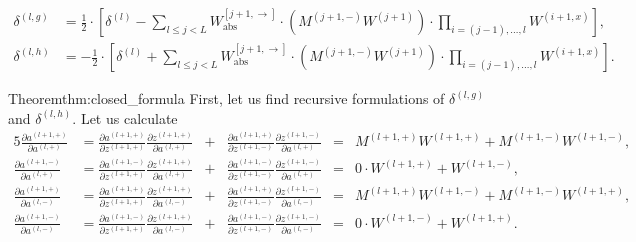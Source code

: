 \begin{theorem} \label{thm:closed_formula}
    \begin{align}
        \delta^{(l, g)}
            &= \frac{1}{2} \cdot \left[ \delta^{(l)}- \sum_{l \leq j < L} W_{\text{abs}}^{[j+1, \rightarrow]} \cdot \left( M^{(j+1,-)}W^{(j+1)} \right) \cdot \prod_{i = (j-1),\dots, l} W^{(i+1, x)} \right], \\
        \delta^{(l, h)}
            &= -\frac{1}{2} \cdot \left[ \delta^{(l)} + \sum_{l \leq j < L} W_{\text{abs}}^{[j+1, \rightarrow]} \cdot \left( M^{(j+1,-)}W^{(j+1)} \right) \cdot \prod_{i = (j-1),\dots, l} W^{(i+1, x)} \right].
    \end{align}
\end{theorem}

\begin{proofref}{Theorem}{thm:closed_formula}  
    First, let us find recursive formulations of $\delta^{(l, g)}$ and $\delta^{(l, h)}$.
    Let us calculate
    \begin{alignat}{5}
        \frac{\partial a^{(l+1,+)}}{\partial a^{(l,+)}}
            &={} \frac{\partial a^{(l+1,+)}}{\partial z^{(l+1,+)}} 
                   \frac{\partial z^{(l+1,+)}}{\partial a^{(l,+)}}
            &+{}& \frac{\partial a^{(l+1,+)}}{\partial z^{(l+1,-)}} 
                   \frac{\partial z^{(l+1,-)}}{\partial a^{(l,+)}}
            &={}& M^{(l+1,+)} W^{(l+1,+)} + M^{(l+1,-)} W^{(l+1,-)}, \\[6pt]
        \frac{\partial a^{(l+1,-)}}{\partial a^{(l,+)}}
            &={} \frac{\partial a^{(l+1,-)}}{\partial z^{(l+1,+)}} 
                   \frac{\partial z^{(l+1,+)}}{\partial a^{(l,+)}}
            &+{}& \frac{\partial a^{(l+1,-)}}{\partial z^{(l+1,-)}} 
                   \frac{\partial z^{(l+1,-)}}{\partial a^{(l,+)}}
            &={}& 0 \cdot W^{(l+1,+)} + W^{(l+1,-)}, \\[6pt]
        \frac{\partial a^{(l+1,+)}}{\partial a^{(l,-)}}
            &={} \frac{\partial a^{(l+1,+)}}{\partial z^{(l+1,+)}} 
                   \frac{\partial z^{(l+1,+)}}{\partial a^{(l,-)}}
            &+{}& \frac{\partial a^{(l+1,+)}}{\partial z^{(l+1,-)}} 
                   \frac{\partial z^{(l+1,-)}}{\partial a^{(l,-)}}
            &={}& M^{(l+1,+)} W^{(l+1,-)} + M^{(l+1,-)} W^{(l+1,+)}, \\[6pt]
        \frac{\partial a^{(l+1,-)}}{\partial a^{(l,-)}}
            &={} \frac{\partial a^{(l+1,-)}}{\partial z^{(l+1,+)}} 
                   \frac{\partial z^{(l+1,+)}}{\partial a^{(l,-)}}
            &+{}& \frac{\partial a^{(l+1,-)}}{\partial z^{(l+1,-)}} 
                   \frac{\partial z^{(l+1,-)}}{\partial a^{(l,-)}}
            &={}& 0 \cdot W^{(l+1,-)} + W^{(l+1,+)}.
    \end{alignat}
    

\end{proofref}
